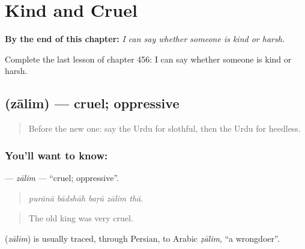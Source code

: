 
\chapter{Kind and Cruel}
\label{ch:ur-kind-and-cruel}

\begin{chapteropening}
\textbf{By the end of this chapter:} \emph{I can say whether someone is kind or harsh.}

Complete the last lesson of chapter 456: I can say whether someone is kind or harsh.
\end{chapteropening}

\section[\texorpdfstring{\ur{ظالم} (zālim)}{ظالم (zālim)}]{ (zālim) — cruel; oppressive}

\label{lesson:UR-C456-zalim}



\begin{quote}
Before the new one: say the Urdu for slothful, then the Urdu for heedless.
\end{quote}

\subsection*{You'll want to know: }
\textbf{} — \emph{zālim} — \textquotedblleft{}cruel; oppressive\textquotedblright{}.

\begin{quote}
    
\end{quote}

\begin{quote}
\emph{purānā bādshāh baṛā zālim thā.}
\end{quote}

\begin{quote}
The old king was very cruel.
\end{quote}

\begin{cousinweb}
\textbf{} (\emph{zālim}) is usually traced, through Persian, to Arabic \emph{ẓālim}, \textquotedblleft{}a wrongdoer\textquotedblright{}.
\end{cousinweb}

